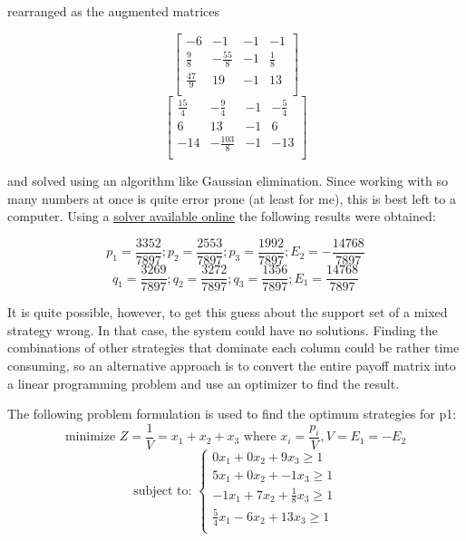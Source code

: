\documentclass[12pt, a4paper]{article}
\begin{document}
rearranged as the augmented matrices

\begin{equation}
    \begin{bmatrix}
        -6 & -1 & -1 & -1 \\
        \frac{9}{8} & -\frac{55}{8} & -1 & \frac{1}{8}\\
        \frac{47}{9} & 19 & -1 & 13 \\ 
    \end{bmatrix}
\end{equation}
\begin{equation}
    \begin{bmatrix}
        \frac{15}{4} & -\frac{9}{4} & -1 & -\frac{5}{4} \\
        6 & 13 & -1 & 6 \\
        -14 & -\frac{103}{8} & -1 & -13 \\ 
    \end{bmatrix}
\end{equation}

and solved using an algorithm like Gaussian elimination. Since working with so many numbers at once is quite error prone (at least for me), this is best left to a computer. Using a \href{https://matrixcalc.org/en/slu.html}{solver available online} the following results were obtained:

\begin{equation}
    p_1=\frac{3352}{7897};p_2=\frac{2553}{7897};p_3=\frac{1992}{7897};E_2=-\frac{14768}{7897}
\end{equation}
\begin{equation}
    q_1=\frac{3269}{7897};q_2=\frac{3272}{7897};q_3=\frac{1356}{7897};E_1=\frac{14768}{7897}
\end{equation}

It is quite possible, however, to get this guess about the support set of a mixed strategy wrong. In that case, the system could have no solutions. Finding the combinations of other strategies that dominate each column could be rather time consuming, so an alternative approach is to convert the entire payoff matrix into a linear programming problem and use an optimizer to find the result.

The following problem formulation is used to find the optimum strategies for p1:
\begin{equation}
    \text{minimize }Z=\frac{1}{V}=x_1+x_2+x_3 \text{ where } x_i=\frac{p_i}{V}, V=E_1=-E_2
\end{equation}
\begin{equation}
    \text{subject to: }
    \begin{cases}
        0x_1+0x_2+9x_3 \geq 1 \\
        5x_1+0x_2+-1x_3 \geq 1 \\
        -1x_1+7x_2+\frac{1}{8}x_3 \geq 1 \\
        \frac{5}{4}x_1-6x_2+13x_3 \geq 1 \\
    \end{cases}
\end{equation}
\end{document}
